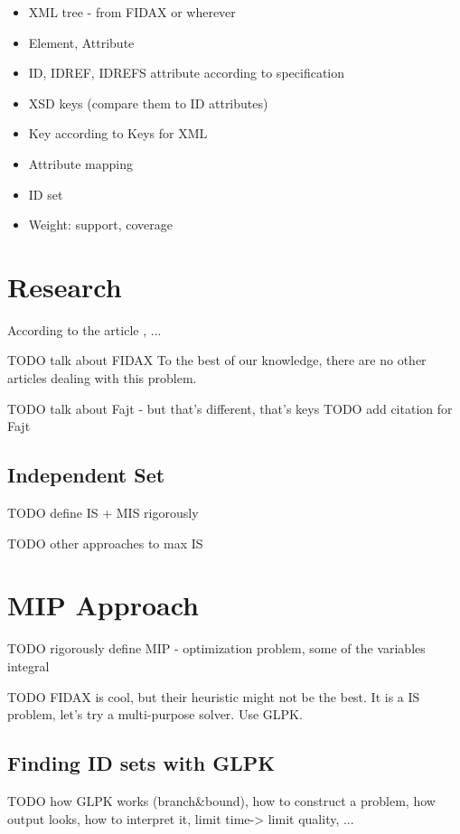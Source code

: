 \documentclass[a4paper,12pt,oneside]{report}
\begin{document}
\begin{itemize}
	\item XML tree - from FIDAX or wherever
	\item Element, Attribute
	\item ID, IDREF, IDREFS attribute according to specification
	\item XSD keys (compare them to ID attributes)
	\item Key according to Keys for XML \cite{keX}
	\item Attribute mapping
	\item ID set
  \item Weight: support, coverage
\end{itemize}

\chapter{Research}

According to the article \cite{fidax}, ...

TODO talk about FIDAX
To the best of our knowledge, there are no other articles dealing with this problem. 

TODO talk about Fajt - but that's different, that's keys
TODO add citation for Fajt

\section{Independent Set}

TODO define IS + MIS rigorously

TODO other approaches to max IS

\chapter{MIP Approach}

TODO rigorously define MIP - optimization problem, some of the variables integral

TODO FIDAX is cool, but their heuristic might not be the best. It is a IS problem, let's try a multi-purpose solver. Use GLPK. 

\section{Finding ID sets with GLPK}

TODO how GLPK works (branch&bound), how to construct a problem, how output looks, how to interpret it, limit time-> limit quality, ...
 
\end{document}
